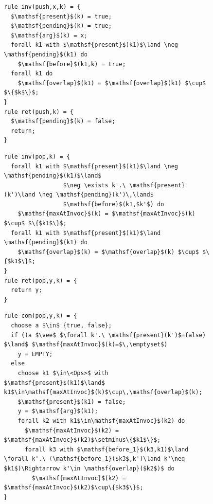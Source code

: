 \begin{figure} [t]
\vspace{-5mm}
\begin{minipage}[t]{6.2cm}
\begin{lstlisting}
rule inv(push,x,k) = {
  $\mathsf{present}$(k) = true;
  $\mathsf{pending}$(k) = true;
  $\mathsf{arg}$(k) = x;
  forall k1 with $\mathsf{present}$(k1)$\land \neg \mathsf{pending}$(k1) do
    $\mathsf{before}$(k1,k) = true;
  forall k1 do
    $\mathsf{overlap}$(k1) = $\mathsf{overlap}$(k1) $\cup$ $\{$k$\}$;
}
rule ret(push,k) = {
  $\mathsf{pending}$(k) = false;
  return;
}
\end{lstlisting}
\end{minipage}
\begin{minipage}[t]{5cm}
\begin{lstlisting}
rule inv(pop,k) = {
  forall k1 with $\mathsf{present}$(k1)$\land \neg \mathsf{pending}$(k1)$\land$
                 $\neg \exists k'.\ \mathsf{present}(k')\land \neg \mathsf{pending}(k')\,\land$ 
                 $\mathsf{before}$(k1,$k'$) do
    $\mathsf{maxAtInvoc}$(k) = $\mathsf{maxAtInvoc}$(k) $\cup$ $\{$k1$\}$;
  forall k1 with $\mathsf{present}$(k1)$\land \mathsf{pending}$(k1) do
    $\mathsf{overlap}$(k) = $\mathsf{overlap}$(k) $\cup$ $\{$k1$\}$;
}
rule ret(pop,y,k) = {
  return y;
}
\end{lstlisting}
\end{minipage}

\vspace{-4mm}
\begin{lstlisting}
rule com(pop,y,k) = {
  choose a $\in$ {true, false};
  if ((a $\vee$ $\forall k'.\ \mathsf{present}(k')$=false) $\land$ $\mathsf{maxAtInvoc}$(k)=$\,\emptyset$) 
    y = EMPTY;
  else 
    choose k1 $\in\<Ops>$ with $\mathsf{present}$(k1)$\land$ k1$\in\mathsf{maxAtInvoc}$(k)$\cup\,\mathsf{overlap}$(k);
    $\mathsf{present}$(k1) = false;
    y = $\mathsf{arg}$(k1);
    forall k2 with k1$\in\mathsf{maxAtInvoc}$(k2) do
      $\mathsf{maxAtInvoc}$(k2) = $\mathsf{maxAtInvoc}$(k2)$\setminus\{$k1$\}$;
      forall k3 with $\mathsf{before_1}$(k3,k1)$\land \forall k'.\ (\mathsf{before_1}($k3$,k')\land k'\neq $k1$)\Rightarrow k'\in \mathsf{overlap}($k2$)$ do
        $\mathsf{maxAtInvoc}$(k2) = $\mathsf{maxAtInvoc}$(k2)$\cup\{$k3$\}$;
}
\end{lstlisting}


\end{figure}
